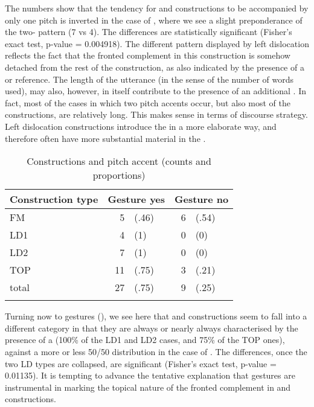 \documentclass[output=paper]{LSP/langsci}
\begin{document}
The numbers show that the tendency for  and
 constructions to be accompanied by only one pitch
 is inverted in the case of , where we see a
slight preponderance of the two- pattern (7 vs 4). The
differences are statistically significant (Fisher's exact test,
p-value = 0.004918). The different pattern displayed by left
dislocation reflects the fact that the fronted complement in this
construction is somehow detached from the rest of the construction, as
also indicated by the presence of a  or  reference.
The length of the utterance (in the sense of the number of words
used), may also, however, in itself contribute to the presence of an additional
. In fact, most of the cases in which two pitch accents
occur, but also most of the  constructions, are
relatively long.
This makes sense in terms of discourse strategy. Left dislocation
constructions introduce the  in a more elaborate way, and
therefore often have more substantial material in the .

\begin{table}[b]
  \begin{tabular}{lrlrl}
    \lsptoprule
 Construction type     & \multicolumn{2}{c}{Gesture yes} & \multicolumn{2}{c}{Gesture no} \\
    \midrule
FM & 5 & (.46) & 6 & (.54)  \\
LD1 & 4 & (1) & 0 & (0)  \\
LD2 & 7 & (1) & 0 & (0)  \\
TOP & 11 & (.75) & 3 & (.21)  \\
\midrule
total & 27 & (.75) & 9 & (.25) \\
\lspbottomrule
  \end{tabular}
  \caption{Constructions and pitch accent (counts and proportions)}
  \label{tab:paggio:const_gesture}
\end{table}

Turning now to gestures (), we see here
that  and  constructions seem to fall into
a different category in that they are always or nearly always
characterised by the presence of a  (100\% of the LD1 and LD2
cases, and 75\% of the TOP ones), against a more or less 50/50
distribution in the case of . The differences, %
once the two LD types are collapsed, are significant (Fisher's exact
test, p-value = 0.01135).
It is tempting to advance the tentative explanation that gestures are
instrumental in marking the topical nature of the fronted complement
in  and  constructions. 
\end{document}
